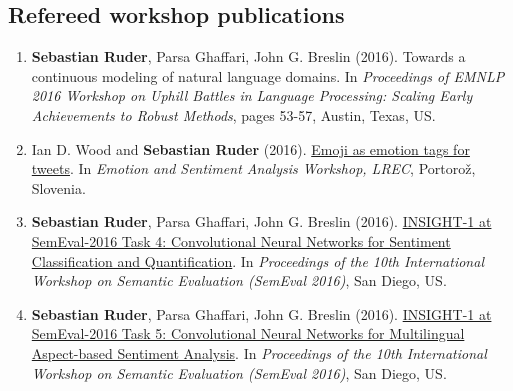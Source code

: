 \documentclass[10pt,letterpaper]{article}
\begin{document}
\vspace{-0.4em}
\subsection*{Refereed workshop publications}
\begin{enumerate}
	\parskip=0.1em
	\setcounter{enumi}{12}

	\item \textbf{Sebastian Ruder}, Parsa Ghaffari, John G. Breslin (2016). Towards a continuous modeling of natural language domains. In \textit{Proceedings of EMNLP 2016 Workshop on Uphill Battles in Language Processing: Scaling Early Achievements to Robust Methods}, pages 53-57, Austin, Texas, US.
	
	\item Ian D. Wood and \textbf{Sebastian Ruder} (2016). \href{http://gsi.dit.upm.es/esa2016/Proceedings-ESA2016.pdf}{Emoji as emotion tags for tweets}. In \textit{Emotion and Sentiment Analysis Workshop, LREC}, Portorož, Slovenia.
	
		\item \textbf{Sebastian Ruder}, Parsa Ghaffari, John G. Breslin (2016). \href{http://www.anthology.aclweb.org/S/S16/S16-1026.pdf}{INSIGHT-1 at SemEval-2016 Task 4: Convolutional Neural Networks for Sentiment Classification and Quantification}. In \textit{Proceedings of the 10th International Workshop on Semantic Evaluation (SemEval 2016)}, San Diego, US.
	
	\item \textbf{Sebastian Ruder}, Parsa Ghaffari, John G. Breslin (2016). \href{http://www.aclweb.org/anthology/S/S16/S16-1053.pdf}{INSIGHT-1 at SemEval-2016 Task 5: Convolutional Neural Networks for Multilingual Aspect-based Sentiment Analysis}. In \textit{Proceedings of the 10th International Workshop on Semantic Evaluation (SemEval 2016)}, San Diego, US.

\end{enumerate}

\vspace{-0.4em}
\end{document}
